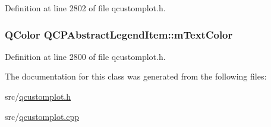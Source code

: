Definition at line 2802 of file qcustomplot.\-h.

\hypertarget{class_q_c_p_abstract_legend_item_a974b21e9930227d281344bd2242d289d}{
\subsubsection[{m\-Text\-Color}]{\setlength{\rightskip}{0pt plus 5cm}Q\-Color Q\-C\-P\-Abstract\-Legend\-Item\-::m\-Text\-Color\hspace{0.3cm}{\ttfamily [protected]}}}\label{class_q_c_p_abstract_legend_item_a974b21e9930227d281344bd2242d289d}


Definition at line 2800 of file qcustomplot.\-h.



The documentation for this class was generated from the following files\-:\begin{DoxyCompactItemize}
\item 
src/\hyperlink{qcustomplot_8h}{qcustomplot.\-h}\item 
src/\hyperlink{qcustomplot_8cpp}{qcustomplot.\-cpp}\end{DoxyCompactItemize}
